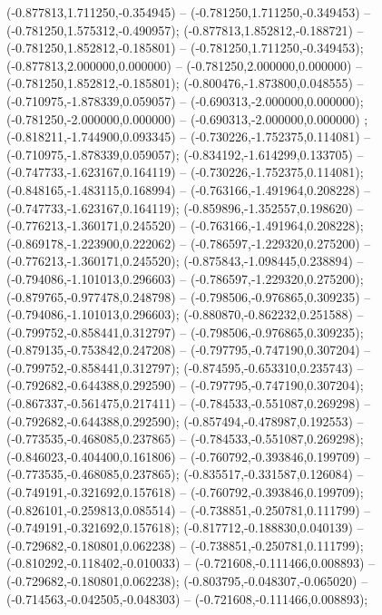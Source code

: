  (-0.877813,1.711250,-0.354945) -- (-0.781250,1.711250,-0.349453) -- (-0.781250,1.575312,-0.490957);
 (-0.877813,1.852812,-0.188721) -- (-0.781250,1.852812,-0.185801) -- (-0.781250,1.711250,-0.349453);
 (-0.877813,2.000000,0.000000) -- (-0.781250,2.000000,0.000000) -- (-0.781250,1.852812,-0.185801);
 (-0.800476,-1.873800,0.048555) -- (-0.710975,-1.878339,0.059057) -- (-0.690313,-2.000000,0.000000);
 (-0.781250,-2.000000,0.000000) -- (-0.690313,-2.000000,0.000000) ;
 (-0.818211,-1.744900,0.093345) -- (-0.730226,-1.752375,0.114081) -- (-0.710975,-1.878339,0.059057);
 (-0.834192,-1.614299,0.133705) -- (-0.747733,-1.623167,0.164119) -- (-0.730226,-1.752375,0.114081);
 (-0.848165,-1.483115,0.168994) -- (-0.763166,-1.491964,0.208228) -- (-0.747733,-1.623167,0.164119);
 (-0.859896,-1.352557,0.198620) -- (-0.776213,-1.360171,0.245520) -- (-0.763166,-1.491964,0.208228);
 (-0.869178,-1.223900,0.222062) -- (-0.786597,-1.229320,0.275200) -- (-0.776213,-1.360171,0.245520);
 (-0.875843,-1.098445,0.238894) -- (-0.794086,-1.101013,0.296603) -- (-0.786597,-1.229320,0.275200);
 (-0.879765,-0.977478,0.248798) -- (-0.798506,-0.976865,0.309235) -- (-0.794086,-1.101013,0.296603);
 (-0.880870,-0.862232,0.251588) -- (-0.799752,-0.858441,0.312797) -- (-0.798506,-0.976865,0.309235);
 (-0.879135,-0.753842,0.247208) -- (-0.797795,-0.747190,0.307204) -- (-0.799752,-0.858441,0.312797);
 (-0.874595,-0.653310,0.235743) -- (-0.792682,-0.644388,0.292590) -- (-0.797795,-0.747190,0.307204);
 (-0.867337,-0.561475,0.217411) -- (-0.784533,-0.551087,0.269298) -- (-0.792682,-0.644388,0.292590);
 (-0.857494,-0.478987,0.192553) -- (-0.773535,-0.468085,0.237865) -- (-0.784533,-0.551087,0.269298);
 (-0.846023,-0.404400,0.161806) -- (-0.760792,-0.393846,0.199709) -- (-0.773535,-0.468085,0.237865);
 (-0.835517,-0.331587,0.126084) -- (-0.749191,-0.321692,0.157618) -- (-0.760792,-0.393846,0.199709);
 (-0.826101,-0.259813,0.085514) -- (-0.738851,-0.250781,0.111799) -- (-0.749191,-0.321692,0.157618);
 (-0.817712,-0.188830,0.040139) -- (-0.729682,-0.180801,0.062238) -- (-0.738851,-0.250781,0.111799);
 (-0.810292,-0.118402,-0.010033) -- (-0.721608,-0.111466,0.008893) -- (-0.729682,-0.180801,0.062238);
 (-0.803795,-0.048307,-0.065020) -- (-0.714563,-0.042505,-0.048303) -- (-0.721608,-0.111466,0.008893);
